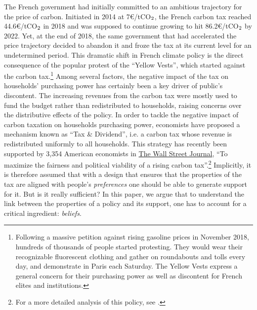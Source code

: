 \documentclass[11pt]{article}
\begin{document}
The French government had initially committed to an ambitious trajectory for the price of carbon. Initiated in 2014 at 7\euro/tCO$_\textnormal{2}$, the French carbon tax reached 44.6\euro/tCO$_\textnormal{2}$ in 2018 and was supposed to continue growing to hit 86.2\euro/tCO$_\textnormal{2}$ by 2022. Yet, at the end of 2018, the same government that had accelerated the price trajectory decided to abandon it and froze the tax at its current level for an undetermined period. This dramatic shift in French climate policy is the direct consequence of the popular protest of the ``Yellow Vests'', which started against the carbon tax.\footnote{Following a massive petition against rising gasoline prices in November 2018, hundreds of thousands of people started protesting. They would wear their recognizable fluorescent clothing and gather on roundabouts and tolls every day, and demonstrate in Paris each Saturday. The Yellow Vests express a general concern for their purchasing power as well as discontent for French elites and institutions.} Among several factors, the negative impact of the tax on households' purchasing power has certainly been a key driver of public's discontent. The increasing revenues from the carbon tax were mostly used to fund the budget rather than redistributed to households, raising concerns over the distributive effects of the policy. In order to tackle the negative impact of carbon taxation on households purchasing power, economists have proposed a mechanism known as ``Tax \& Dividend'', i.e. a carbon tax whose revenue is redistributed uniformly to all households. This strategy has recently been supported by 3,354 American economists in \href{https://www.clcouncil.org/media/EconomistsStatement.pdf}{The Wall Street Journal}, ``To maximize the fairness and political viability of a rising carbon tax''.\footnote{For a more detailed analysis of this policy, see \citet{metcalf_design_2009}.} Implicitly, it is therefore assumed that with a design that ensures that the properties of the tax are aligned with people's \textit{preferences} one should be able to generate support for it. But is it really sufficient? In this paper, we argue that to understand the link between the properties of a policy and its support, one has to account for a critical ingredient: \textit{beliefs}.
\end{document}
